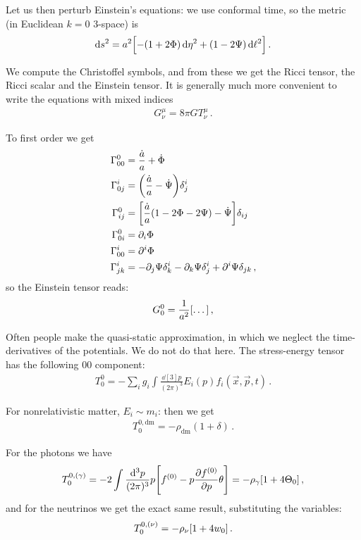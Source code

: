 \documentclass[main.tex]{subfiles}
\begin{document}
Let us then perturb Einstein's equations: we use conformal time, so the metric (in Euclidean \(k=0\) 3-space) is 
%
\begin{align}
\dd{s^2} = a^2 \qty[- (1 + 2 \Phi ) \dd{\eta^2} + (1- 2 \Psi ) \dd{\ell^2}]
\,.
\end{align}

We compute the Christoffel symbols, and from these we get the Ricci tensor, the Ricci scalar and the Einstein tensor. 
It is generally much more convenient to write the equations with mixed indices 
%
\begin{align}
G^{\mu }_{\nu } = 8 \pi G T^{\mu }_{\nu }
\,.
\end{align}

To first order we get 
%
\begin{align}
\Gamma^{0}_{00} &= \frac{ \dot{a} }{a } + \dot{\Phi}  \\
\Gamma^{i}_{0j }&= \qty(\frac{\dot{a}}{a} - \dot{\Psi}) \delta^{i}_{j}  \\
\Gamma^{0}_{ij} &= \qty[\frac{\dot{a}}{a } \qty(1 - 2 \Phi - 2 \Psi ) - \dot{\Psi}] \delta_{ij}  \\
\Gamma^{0}_{0i} &= \partial_{i} \Phi   \\
\Gamma^{i}_{00} &= \partial^{i} \Phi   \\
\Gamma^{i}_{jk} &= - \partial_{j} \Psi \delta^{i}_{k} - \partial_{k} \Psi \delta^{i}_{j} + \partial^{i} \Psi 
\delta_{jk}
\,,
\end{align}
%
so the Einstein tensor reads: 
%
\begin{align}
G^{0}_{0} = \frac{1}{a^2} \qty[\dots]
\,,
\end{align}
%

Often people make the quasi-static approximation, in which we neglect the time-derivatives of the potentials. We do not do that here. 
The stress-energy tensor has the following 00 component: 
%
\begin{align}
T^{0}_{0} = - \sum _{i} g_i \int  \frac{ \dd[3]{p}}{(2 \pi )^3} E_i (p) f_i (\vec{x}, \vec{p} ,t)
\,.
\end{align}

For nonrelativistic matter, \(E_i \sim m_i\): then we get 
%
\begin{align}
T^{0, \text{dm}}_{0} = - \rho_{\text{dm}} (1 + \delta )
\,.
\end{align}

For the photons we have 
%
\begin{align}
T^{0,(\gamma )}_{0} = 
-2 \int \frac{\dd[3]{p}}{(2 \pi )^3} p \qty[f^{(0)} - p \pdv{f^{(0)}}{p} \theta ] 
= - \rho_{\gamma } \qty[ 1 + 4 \Theta_0 ]
\,,
\end{align}
%
and for the neutrinos we get the exact same result, substituting the variables: 
%
\begin{align}
T_{0}^{0, (\nu )} = - \rho_{\nu } \qty[1 + 4 w_0 ]
\,.
\end{align}
\end{document}
